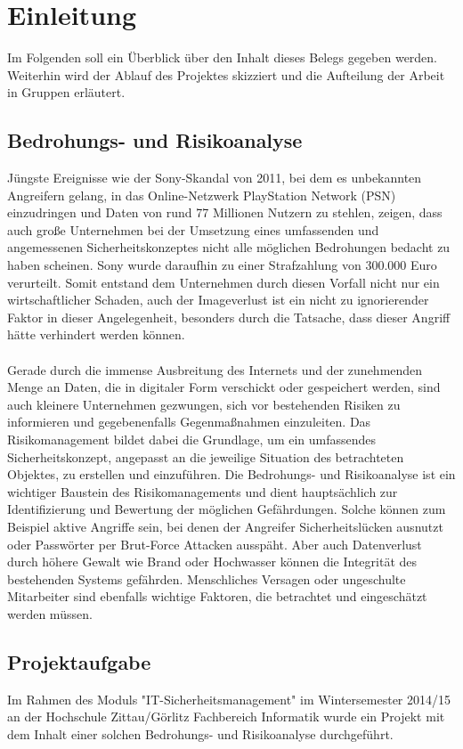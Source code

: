 \section{Einleitung}
Im Folgenden soll ein Überblick über den Inhalt dieses Belegs gegeben werden. Weiterhin wird der Ablauf des Projektes skizziert und die Aufteilung der Arbeit in Gruppen erläutert.

\subsection{Bedrohungs- und Risikoanalyse}
Jüngste Ereignisse wie der Sony-Skandal von 2011, bei dem es unbekannten Angreifern gelang, in das Online-Netzwerk PlayStation Network (PSN) einzudringen und Daten von rund 77 Millionen Nutzern zu stehlen, zeigen, dass auch große Unternehmen bei der Umsetzung eines umfassenden und angemessenen Sicherheitskonzeptes nicht alle möglichen Bedrohungen bedacht zu haben scheinen. Sony wurde daraufhin zu einer Strafzahlung von 300.000 Euro verurteilt. Somit entstand dem Unternehmen durch diesen Vorfall nicht nur ein wirtschaftlicher Schaden, auch der Imageverlust ist ein nicht zu ignorierender Faktor in dieser Angelegenheit, besonders durch die Tatsache, dass dieser Angriff hätte verhindert werden können. 
\\
\\
Gerade durch die immense Ausbreitung des Internets und der zunehmenden Menge an Daten, die in digitaler Form verschickt oder gespeichert werden, sind auch kleinere Unternehmen gezwungen, sich vor bestehenden Risiken zu informieren und gegebenenfalls Gegenmaßnahmen einzuleiten. Das Risikomanagement bildet dabei die Grundlage, um ein umfassendes Sicherheitskonzept, angepasst an die jeweilige Situation des betrachteten Objektes, zu erstellen und einzuführen. Die Bedrohungs- und Risikoanalyse ist ein wichtiger Baustein des Risikomanagements und dient hauptsächlich zur Identifizierung und Bewertung der möglichen Gefährdungen. Solche können zum Beispiel aktive Angriffe sein, bei denen der Angreifer Sicherheitslücken ausnutzt oder Passwörter per Brut-Force Attacken ausspäht. Aber auch Datenverlust durch höhere Gewalt wie Brand oder Hochwasser können die Integrität des bestehenden Systems gefährden. Menschliches Versagen oder ungeschulte Mitarbeiter sind ebenfalls wichtige Faktoren, die betrachtet und eingeschätzt werden müssen.

\subsection{Projektaufgabe}
Im Rahmen des Moduls "IT-Sicherheitsmanagement" im Wintersemester 2014/15 an der Hochschule Zittau/Görlitz Fachbereich Informatik wurde ein Projekt mit dem Inhalt einer solchen Bedrohungs- und Risikoanalyse durchgeführt. 


